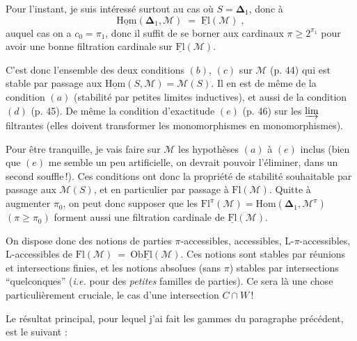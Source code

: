 \documentclass[11pt]{article}
\newcommand{\printedpage}[1]{\marginpar{\raggedright\footnotesize p.~#1}}
\newcommand{\msp}[1]{\marginpar{\raggedright\footnotesize [#1]}}
\newcommand{\Ob}{\mathrm{Ob}}
\newcommand{\Fl}{\mathrm{Fl}}
\newcommand{\uHom}{\underline{\mathrm{Hom}}}
\newcommand{\uFl}{\underline{\mathrm{Fl}}}
\begin{document}
Pour l'instant, je suis intéressé surtout au cas où $S = \boldsymbol{\Delta}_{1}$, donc à
\[
\uHom(\boldsymbol{\Delta}_{1},\mathcal{M}) \;=\; \uFl(\mathcal{M}) \; ,
\]
auquel cas on a $c_{0} = \pi_{1}$, donc il suffit de se borner aux cardinaux $\pi \geq 2^{\pi_{1}}$ pour avoir une bonne filtration cardinale sur $\uFl(\mathcal{M})$.

C'est donc l'ensemble des deux conditions $(b)$, $(c)$ sur $\mathcal{M}$ (p. 44) qui est stable par passage aux $\uHom(S,\mathcal{M}) = \mathcal{M}(S)$. Il en est de même de la condition $(a)$ (stabilité par petites limites inductives), et aussi de la condition\msp{page 75}
$(d)$ (p. 45). De même la condition d'exactitude $(e)$ (p. 46) sur les $\varinjlim$ filtrantes (elles doivent transformer les monomorphismes en monomorphismes).

Pour être tranquille, je vais faire sur $\mathcal{M}$ les hypothèses $(a)$ à $(e)$ inclus (bien que $(e)$ me semble un peu artificielle, on devrait pouvoir l'éliminer, dans un second souffle\,!). Ces conditions ont donc la propriété de stabilité souhaitable par passage aux $\mathcal{M}(S)$, et en particulier par passage à $\Fl(\mathcal{M})$. Quitte à augmenter $\pi_{0}$, on peut donc supposer que les $\Fl^{\pi}(\mathcal{M}) = \mathrm{Hom}(\boldsymbol{\Delta}_{1},\mathcal{M}^{\pi})$ $(\pi \geq \pi_{0})$ forment aussi une filtration cardinale de $\uFl(\mathcal{M})$.

On dispose donc des notions de parties $\pi$-accessibles, accessibles, L-$\pi$-accessibles, L-accessibles de $\Fl(\mathcal{M}) \ = \ \Ob\uFl(\mathcal{M})$. Ces notions sont stables par réunions et intersections finies, et les notions absolues (sans $\pi$) stables par intersections ``quelconques'' (\textit{i.e.} pour des \textit{petites} familles de parties). Ce sera là une chose particulièrement\printedpage{42}%
\msp{page 76}
cruciale, le cas d'une intersection $C \cap W$\,!

Le résultat principal, pour lequel j'ai fait les gammes du paragraphe précédent, est le suivant :
\end{document}

